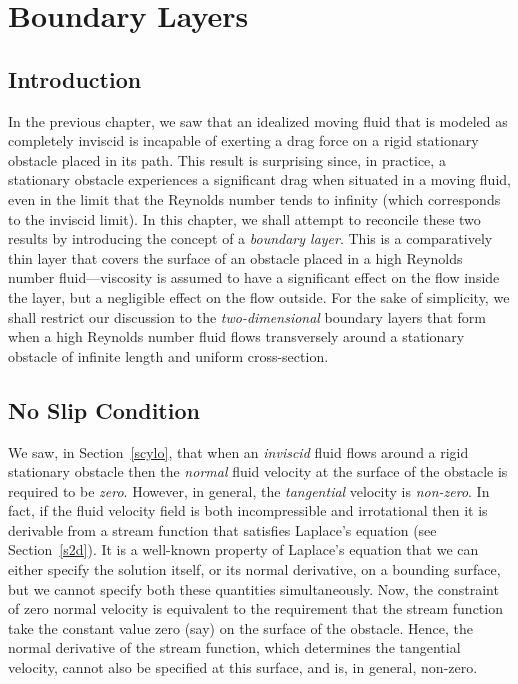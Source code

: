 \chapter{Boundary Layers}
\section{Introduction}
In the previous chapter, we saw that  an idealized moving fluid that is modeled as  completely inviscid    is incapable of exerting a drag force on a rigid  
stationary obstacle placed in its path. This result is surprising  since, in practice,  a stationary obstacle    experiences a significant drag when  situated in
a moving fluid, even in the limit that the
Reynolds number tends to infinity (which corresponds to the inviscid limit).  
In this chapter, we shall attempt to reconcile these two results by introducing the concept of a {\em boundary layer}.
This is a comparatively thin layer that   covers the surface of an obstacle  placed in a high Reynolds number 
fluid---viscosity is assumed to have a significant effect on the flow inside the  layer, but  a negligible 
effect on the flow outside. For the sake of simplicity, we shall restrict our discussion to the {\em two-dimensional}\/
boundary layers that form when a high Reynolds number fluid  flows transversely around a stationary obstacle of infinite length and uniform cross-section. 

\section{No Slip Condition}\label{snoslip}
We saw, in Section~\ref{scylo}, that when an {\em inviscid}\/ fluid flows around a rigid stationary obstacle then the  {\em normal}\/
fluid velocity at the surface of the obstacle is required to be {\em zero}. However, in general, the {\em tangential}\/
velocity is {\em non-zero}. In fact, if the fluid velocity field is both incompressible and  irrotational then it is derivable from a stream function 
that satisfies Laplace's equation (see Section~\ref{s2d}). It is a well-known property of Laplace's equation that we can either specify
the solution itself, or its normal derivative, on  a bounding surface, but we cannot  specify both these
quantities simultaneously. Now, the constraint of zero normal velocity 
 is equivalent to the requirement that the  stream
function take the constant value zero (say) on the surface of the obstacle. Hence, the normal derivative of the stream function, which determines the tangential velocity, cannot also  be specified at this surface, and
is, in general, non-zero. 
 
